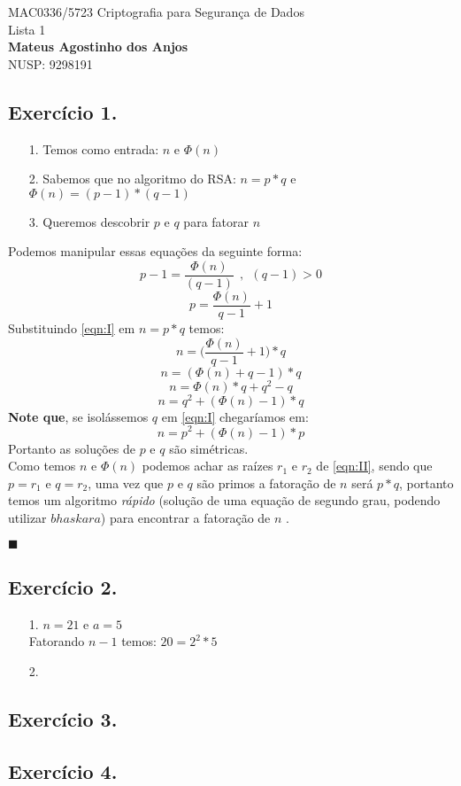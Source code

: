 \documentclass[12pt]{article}
\newcommand{\newqed}{{\hfill\color{black}\ensuremath{\blacksquare}}}
\begin{document}
\begin{center}
{\Large MAC0336/5723 Criptografia para Segurança de Dados\\
Lista 1}\\
\textbf{Mateus Agostinho dos Anjos}\\
NUSP: 9298191
\end{center}

\vspace{0.4 cm}

\subsection*{Exercício 1.}
	\begin{itemize}
		\item[1. ]
			Temos como entrada:	 $n$ e $\Phi(n)$
		\item[2. ]	
			Sabemos que no algoritmo do RSA: $n = p * q$ e $\Phi(n) = (p-1)*(q-1)$
		\item[3. ]	
			Queremos descobrir $p$ e $q$	para fatorar $n$
	\end{itemize}
	Podemos manipular essas equações da seguinte forma:
	$$p - 1 = \frac{\Phi(n)}{(q - 1)}  \ \ , \ \  (q - 1) > 0$$
	\begin{equation}
		\label{eqn:I} \tag{I}
			p = \frac{\Phi(n)}{q - 1} + 1 
	\end{equation}
	Substituindo \eqref{eqn:I} em $n = p * q$ temos:
	$$ n = \Big(\frac{\Phi(n)}{q - 1} + 1\Big) * q $$
	$$ n = (\Phi(n) + q - 1) * q$$
	$$ n = \Phi(n)*q + q^2 - q$$
	\begin{equation}
		\label{eqn:II} \tag{II}
			 n = q^2 + (\Phi(n) - 1) * q
	\end{equation}
	\textbf{Note que}, se isolássemos $q$ em \eqref{eqn:I} chegaríamos em:
	$$n = p^2 + (\Phi(n) - 1) * p$$
	Portanto as soluções de $p$ e $q$ são simétricas.\\
	
	Como temos $n$ e $\Phi(n)$ podemos achar as raízes $r_1$ e $r_2$ de
	\eqref{eqn:II}, sendo que $p = r_1$ e $q = r_2$, uma vez que
	$p$ e $q$ são primos a fatoração de $n$ será $p * q$, portanto temos
	um algoritmo \textit{rápido} (solução de uma equação de segundo grau, podendo
	utilizar $bhaskara$) para encontrar a fatoração de $n$ .
	
	\newqed

\newpage	
\subsection*{Exercício 2.}
	\begin{itemize}
		\item[1. ]
			$n = 21$ e $a = 5$\\
			Fatorando $n-1$ temos: $20 = 2^2*5$
		\item[2. ]	
	\end{itemize}
\subsection*{Exercício 3.}
\subsection*{Exercício 4.}
\end{document}
